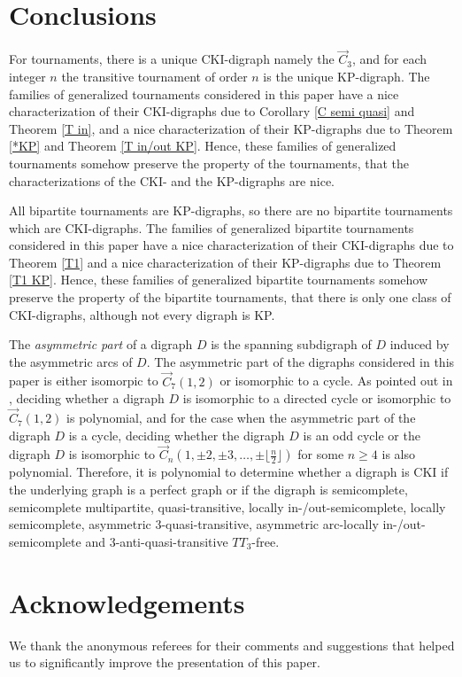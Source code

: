 
\section{Conclusions}
For tournaments, there is a unique CKI-digraph namely the $\overrightarrow{C}_3$, and for each integer $n$ the transitive tournament of order $n$ is the unique KP-digraph.
The  families of generalized tournaments considered in this paper have a nice characterization of their CKI-digraphs due to Corollary  \ref{C semi quasi} and Theorem \ref{T in}, 
and a nice characterization of their KP-digraphs due to Theorem \ref{*KP} and Theorem \ref{T in/out KP}. 
Hence, these families of generalized tournaments somehow preserve the property of the tournaments, that the characterizations of the CKI- and the KP-digraphs are nice.
 
All bipartite tournaments are KP-digraphs, so there are no bipartite tournaments which are CKI-digraphs. 
The  families of generalized bipartite tournaments considered in this paper have a nice characterization of their CKI-digraphs due to 
Theorem \ref{T1} and a nice characterization of their KP-digraphs due to Theorem \ref{T1 KP}. 
Hence, these families of generalized bipartite tournaments somehow preserve the property of the bipartite tournaments, that there is only one class of CKI-digraphs, although not every digraph is KP.

The \emph{asymmetric part} of a digraph $D$ is the spanning subdigraph of $D$ induced by the asymmetric arcs of $D$. 
The asymmetric part of the digraphs considered in this paper is either isomorpic to $\overrightarrow{C}_7(1,2)$ or isomorphic to a cycle. 
As pointed out in \cite{galeana2016characterization}, deciding whether a digraph $D$ is isomorphic to a directed cycle or isomorphic to $\overrightarrow{C}_7(1,2)$ is polynomial, and for the case when the asymmetric part of the digraph $D$ is a cycle, deciding whether the digraph $D$ is an odd cycle or the digraph $D$ is isomorphic to $\overrightarrow{C}_n(1,\pm2,\pm3,\dots,\pm\lfloor \frac{n}{2}\rfloor)$ for some $n\ge4$ is also polynomial. Therefore, it is polynomial to determine whether a digraph is CKI if the underlying graph is a perfect graph or if the digraph is semicomplete, semicomplete multipartite, quasi-transitive, locally in-/out-semicomplete, locally  semicomplete, asymmetric $3$-quasi-transitive, asymmetric arc-locally in-/out-semicomplete and $3$-anti-quasi-transitive $TT_3$-free.

\section{Acknowledgements}
We thank the anonymous referees for their comments and suggestions that helped us to significantly improve the presentation of this paper.

